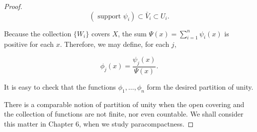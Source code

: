 \begin{proof}
\[
( {\text{ support }{\psi }_{i}}) \subset {\bar{V}}_{i} \subset {U}_{i}\text{.}
\]

Because the collection \(\{ W_{i}\}\) covers \(X\), the sum \(\Psi (x) = \mathop{\sum }\limits_{{i = 1}}^{n}{\psi }_{i}(x)\) is positive for each \(x\). Therefore, we may define, for each \(j\),

\[
{\phi }_{j}(x) = \frac{{\psi }_{j}(x) }{\Psi (x) }.
\]

It is easy to check that the functions \({\phi }_{1},\ldots ,{\phi }_{n}\) form the desired partition of unity.

There is a comparable notion of partition of unity when the open covering and the collection of functions are not finite, nor even countable. We shall consider this matter in Chapter 6, when we study paracompactness.
\end{proof}


